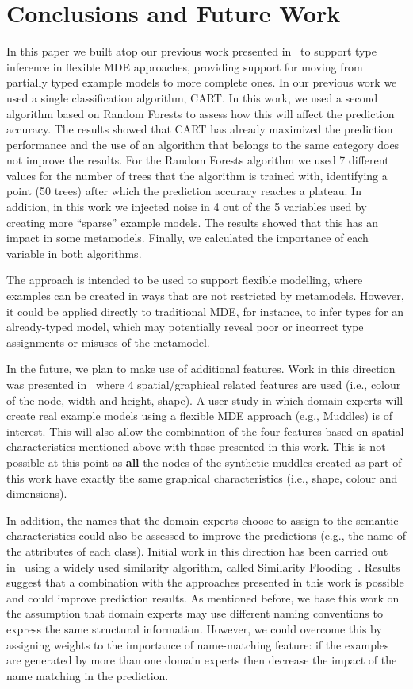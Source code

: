 \section{Conclusions and Future Work}
\label{future}
In this paper we built atop our previous work presented in~\cite{zolotas2015inference} to support type inference in flexible MDE approaches, providing support for moving from partially typed example models to more complete ones. In our previous work we used a single classification algorithm, CART. In this work, we used a second algorithm based on Random Forests to assess how this will affect the prediction accuracy. The results showed that CART has already maximized the prediction performance and the use of an algorithm that belongs to the same category does not improve the results. For the Random Forests algorithm we used 7 different values for the number of trees that the algorithm is trained with, identifying a point (50 trees) after which the prediction accuracy reaches a plateau. In addition, in this work we injected noise in 4 out of the 5 variables used by creating more ``sparse'' example models. The results showed that this has an impact in some metamodels. Finally, we calculated the importance of each variable in both algorithms.

The approach is intended to be used to support flexible modelling, where examples can be created in ways that are not restricted by metamodels. However, it could be applied directly to traditional MDE, for instance, to infer types for an already-typed model, which may potentially reveal poor or incorrect type assignments or misuses of the metamodel.

In the future, we plan to make use of additional features. Work in this direction was presented in~\cite{zolotas2015typeGraphical} where 4 spatial/graphical related features are used (i.e., colour of the node, width and height, shape). A user study in which domain experts will create real example models using a flexible MDE approach (e.g., Muddles) is of interest. This will also allow the combination of the four features based on spatial characteristics mentioned above with those presented in this work. This is not possible at this point as \textbf{all} the nodes of the synthetic muddles created as part of this work have exactly the same graphical characteristics (i.e., shape, colour and dimensions).

In addition, the names that the domain experts choose to assign to the semantic characteristics could also be assessed to improve the predictions (e.g., the name of the attributes of each class). Initial work in this direction has been carried out in~\cite[Chapter~5]{zolotasThesis} using a widely used similarity algorithm, called Similarity Flooding~\cite{melnik2002similarity}. Results suggest that a combination with the approaches presented in this work is possible and could improve prediction results. As mentioned before, we base this work on the assumption that domain experts may use different naming conventions to express the same structural information. However, we could overcome this by assigning weights to the importance of name-matching feature: if the examples are generated by more than one domain experts then decrease the impact of the name matching in the prediction. 


